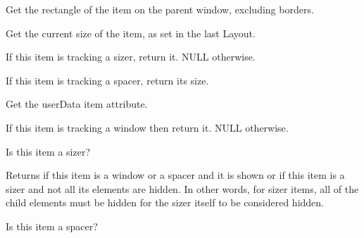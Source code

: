 
Get the rectangle of the item on the parent window, excluding borders.

\label{wxsizeritemgetsize}


Get the current size of the item, as set in the last Layout.

\label{wxsizeritemgetsizer}


If this item is tracking a sizer, return it.  NULL otherwise.


\label{wxsizeritemgetspacer}


If this item is tracking a spacer, return its size.


\label{wxsizeritemgetuserdata}


Get the userData item attribute.


\label{wxsizeritemgetwindow}


If this item is tracking a window then return it.  NULL otherwise.


\label{wxsizeritemissizer}


Is this item a sizer?


\label{wxsizeritemisshown}


Returns \true if this item is a window or a spacer and it is shown or if this
item is a sizer and not all its elements are hidden. In other words, for sizer
items, all of the child elements must be hidden for the sizer itself to be
considered hidden.


\label{wxsizeritemisspacer}


Is this item a spacer?


\label{wxsizeritemiswindow}

